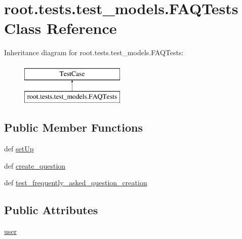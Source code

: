 \hypertarget{classroot_1_1tests_1_1test__models_1_1_f_a_q_tests}{\section{root.\-tests.\-test\-\_\-models.\-F\-A\-Q\-Tests Class Reference}
\label{classroot_1_1tests_1_1test__models_1_1_f_a_q_tests}
}
Inheritance diagram for root.\-tests.\-test\-\_\-models.\-F\-A\-Q\-Tests\-:\begin{figure}[H]
\begin{center}
\leavevmode
\includegraphics[height=2.000000cm]{classroot_1_1tests_1_1test__models_1_1_f_a_q_tests}
\end{center}
\end{figure}
\subsection*{Public Member Functions}
\begin{DoxyCompactItemize}
\item 
def \hyperlink{classroot_1_1tests_1_1test__models_1_1_f_a_q_tests_a07dc6e7a0e8b626165f58d3c9ee9c0d0}{set\-Up}
\item 
def \hyperlink{classroot_1_1tests_1_1test__models_1_1_f_a_q_tests_a983ef97b509c405832c2e961282c2330}{create\-\_\-question}
\item 
def \hyperlink{classroot_1_1tests_1_1test__models_1_1_f_a_q_tests_a8289678af910781599455e2501bdb124}{test\-\_\-frequently\-\_\-asked\-\_\-question\-\_\-creation}
\end{DoxyCompactItemize}
\subsection*{Public Attributes}
\begin{DoxyCompactItemize}
\item 
\hyperlink{classroot_1_1tests_1_1test__models_1_1_f_a_q_tests_a588ecb7bbc54e6cd5661110a3b24c10d}{user}
\end{DoxyCompactItemize}


